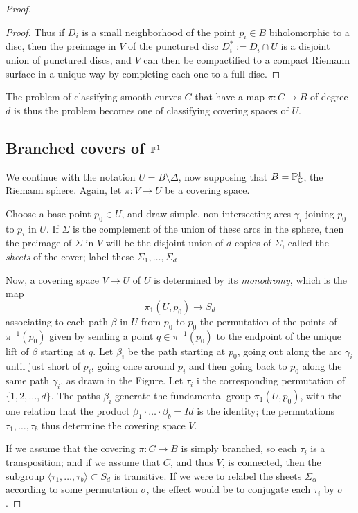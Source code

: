 \begin{proof}
\begin{proof}
Thus if $D_i$ is a small neighborhood of the point $p_i \in B$ biholomorphic to a disc, then the preimage  in $V$ of the punctured disc $D_i^* := D_i \cap U$ is a disjoint union of punctured discs, and $V$ can then be compactified to a compact Riemann surface in a unique way by completing each one to a full disc.
\end{proof}
   
 The problem of classifying smooth curves $C$ that have a map $\pi : C \to B$ of degree $d$ is thus the problem becomes one of classifying covering spaces of $U$. 
    
 \subsection{Branched covers of $\PP^1$} 

We continue with the notation $U = B\setminus \Delta$, now supposing that $B = \PP^1_\CC$, the Riemann sphere. Again, let $\pi:V\to U$ be a covering space.

Choose a base point $p_0 \in U$, and draw simple, non-intersecting arcs $\gamma_i$ joining $p_0$ to $p_i$ in $U$. If $\Sigma$ is the complement of the union of these arcs in the sphere, then the preimage of $\Sigma$ in $V$ will be the disjoint union of $d$ copies of $\Sigma$, called the \emph{sheets} of the cover; label these $\Sigma_1,\dots,\Sigma_d$
   
  
   
   Now, a covering space $V \to U$ of $U$ is determined by its \emph{monodromy}, which is the map
   $$
   \pi_1(U, p_0) \to S_d
   $$
   associating to each path  $\beta$ in $U$ from $p_0$ to $p_0$  the permutation of the points of $\pi^{-1}(p_0)$ given by sending a point $q \in \pi^{-1}(p_0)$ to the endpoint of the unique lift of $\beta$ starting at $q$. Let $\beta_i$ be the path starting at $p_0$, going out along the arc $\gamma_i$ until just short of $p_i$, going once around $p_i$ and then going back to $p_0$ along the same path $\gamma_i$, as drawn in the Figure. Let $\tau_i$ i the corresponding permutation of $\{1,2,\dots,d\}$. The paths $\beta_i$  generate the fundamental group $\pi_1(U, p_0)$, with the one relation that the product $\beta_1\cdot \dots \cdot \beta_b = Id$ is the identity; the permutations $\tau_1,\dots,\tau_b$ thus determine the covering space $V$.
   
 
 
If we assume that the covering
$\pi : C \to B$ is simply branched, so each $\tau_i$ is a transposition; and if we assume that
$C$, and thus $V$, is connected, then the subgroup $\langle \tau_1, \dots, \tau_b \rangle \subset S_d$ is transitive. If we were to relabel the sheets $\Sigma_\alpha$ according to some permutation $\sigma$, the effect would be to conjugate each $\tau_i$ by $\sigma$. 


\end{proof}
